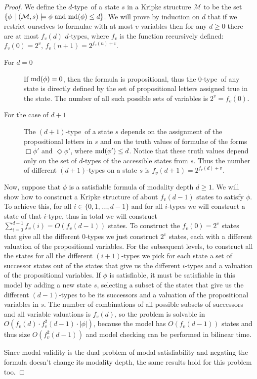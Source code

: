 \documentclass{llncs}
\newcommand{\md}{\ensuremath \textrm{md}}
\newcommand{\palto}{type}
\newcommand{\M}{\ensuremath{\mathcal M}}
\begin{document}
\begin{proof}
We define the $d$-\palto\ of a state $s$ in a Kripke structure $\mathcal M$ to
be the set $\{\phi\ |\ (\M,s) \models \phi \textrm{ and } \md(\phi) \leq d \}$.
We will prove by induction on $d$ that if we restrict ourselves to formulae
with at most $v$ variables then for any $d \geq 0$ there are at most $f_v(d)$
$d$-\palto s, where $f_v$ is the function recursively defined: $ f_v(0) = 2^v$,
\hbox{$f_v(n+1) = 2^{f_v(n) + v}$}.

\begin{description}
\item[For $d = 0$] If $\md(\phi) = 0$, then the formula is propositional, thus
the $0$-\palto\ of any state is directly defined by the set of propositional
letters assigned true in the state. The number of all such possible sets of
variables is $2^v = f_v(0)$.
\item[For the case of $d+1$] The $(d+1)$-\palto\ of
a state $s$ depends on the assignment of the propositional letters in $s$ and
on the truth values of formulae of the forms $\Box \phi'$ and $\Diamond \phi'$,
where $\md(\phi')\leq d$. Notice that these truth values depend only on the set
of $d$-\palto s of the accessible states from $s$. Thus the number of different
$(d+1)$-\palto s on a state $s$ is $f_v(d+1) = 2^{f_v(d)+v}$.
\end{description}

Now, suppose that $\phi$ is a satisfiable formula of modality depth $d\ge 1$.
We will show how to construct a Kripke structure of about $f_v(d-1)$ states to
satisfy $\phi$. To achieve this, for all $i\in\{0,1,\ldots,d-1\}$ and for all
$i$-types we will construct a state of that $i$-type, thus in total we will
construct $\sum_{i=0}^{d-1} f_v(i)= O(f_v(d-1))$ states. To construct the
$f_v(0)=2^v$ states that give all the different $0$-types we just construct
$2^v$ states, each with a different valuation of the propositional variables.
For the subsequent levels, to construct all the states for all the different
$(i+1)$-types we pick for each state a set of successor states out of the
states that give us the different $i$-types and a valuation of the
propositional variables. If $\phi$ is satisfiable, it must be satisfiable in
this model by adding a new state $s$, selecting a subset of the states that
give us the different $(d-1)$-types to be its successors and a valuation of the
propositional variables in $s$. The number of combinations of all possible
subsets of successors and all variable valuations is $f_v(d)$, so the problem
is solvable in $O(f_v(d)\cdot f_v^2(d-1)\cdot|\phi|)$, because the model has
$O(f_v(d-1))$ states and thus size $O(f_v^2(d-1))$ and model checking can be
performed in bilinear time.

Since modal validity is the dual problem of modal satisfiability and negating
the formula doesn't change its modality depth, the same results hold for this
problem too.

\end{proof}
\end{document}
